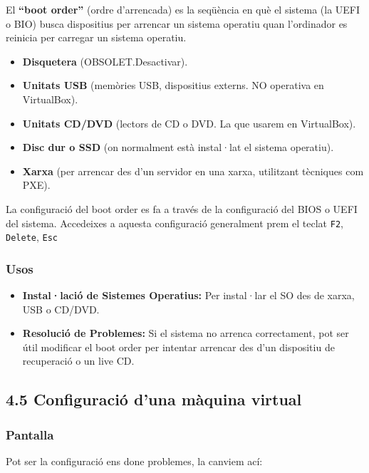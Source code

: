 \documentclass[
  spanish,
  12 pt,
  a4paper,
]{article}
\providecommand{\tightlist}{%
  \setlength{\itemsep}{0pt}\setlength{\parskip}{0pt}}
\begin{document}
El \textbf{``boot order''} (ordre d'arrencada) es la seqüència en què el
sistema (la UEFI o BIO) busca dispositius per arrencar un sistema
operatiu quan l'ordinador es reinicia per carregar un sistema operatiu.

\begin{itemize}
\tightlist
\item
  \textbf{Disquetera} (OBSOLET.Desactivar).
\item
  \textbf{Unitats USB} (memòries USB, dispositius externs. NO operativa
  en VirtualBox).
\item
  \textbf{Unitats CD/DVD} (lectors de CD o DVD. La que usarem en
  VirtualBox).
\item
  \textbf{Disc dur o SSD} (on normalment està instal·lat el sistema
  operatiu).
\item
  \textbf{Xarxa} (per arrencar des d'un servidor en una xarxa,
  utilitzant tècniques com PXE).
\end{itemize}

La configuració del boot order es fa a través de la configuració del
BIOS o UEFI del sistema. Accedeixes a aquesta configuració generalment
prem el teclat \texttt{F2}, \texttt{Delete}, \texttt{Esc}

\subsubsection{Usos}\label{usos}

\begin{itemize}
\tightlist
\item
  \textbf{Instal·lació de Sistemes Operatius:} Per instal·lar el SO des
  de xarxa, USB o CD/DVD.
\item
  \textbf{Resolució de Problemes:} Si el sistema no arrenca
  correctament, pot ser útil modificar el boot order per intentar
  arrencar des d'un dispositiu de recuperació o un live CD.
\end{itemize}

\subsection{4.5 Configuració d'una màquina
virtual}\label{configuraciuxf3-duna-muxe0quina-virtual}

\subsubsection{Pantalla}\label{pantalla}

Pot ser la configuració ens done problemes, la canviem ací:
\end{document}
